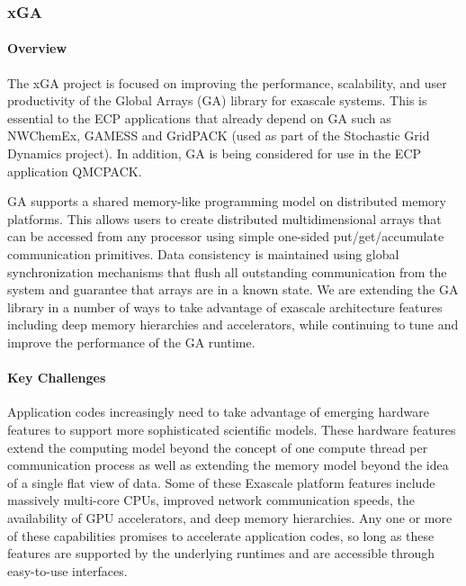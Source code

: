 \subsubsection{ xGA} 

\paragraph{Overview} 

The xGA project is focused on improving the performance, scalability,
and user productivity of the Global Arrays (GA) library for exascale
systems.  This is essential to the ECP applications that already depend
on GA such as NWChemEx\cite{xGA_NWCHEM}, GAMESS\cite{xGA_GAMESS} and
GridPACK\cite{xGA_GRIDPACK} (used as part of the Stochastic Grid
Dynamics project).  In addition, GA is being considered for use in the
ECP application QMCPACK\cite{xGA_QMCPACK}.

GA supports a shared memory-like programming model on distributed memory
platforms.  This allows users to create distributed multidimensional
arrays that can be accessed from any processor using simple one-sided
put/get/accumulate communication primitives. Data consistency is maintained
using global synchronization mechanisms that flush all outstanding communication
from the system and guarantee that arrays are in a known state.
We are extending the GA library in a number of ways to take advantage of
exascale architecture features including
deep memory hierarchies and accelerators, while continuing to tune and
improve the performance of the GA runtime.

\paragraph{Key  Challenges}

Application codes increasingly need to take advantage of emerging
hardware features to support more sophisticated scientific models. These
hardware features extend the computing model beyond the concept of one compute
thread per communication process as well as extending the memory model beyond
the idea of a single flat view of data. Some of these Exascale platform features
include massively multi-core CPUs, improved network communication speeds, the
availability of GPU accelerators, and deep memory hierarchies. Any one or more
of these capabilities promises to accelerate application codes, so long as these
features are supported by the underlying runtimes and are accessible
through easy-to-use interfaces.


